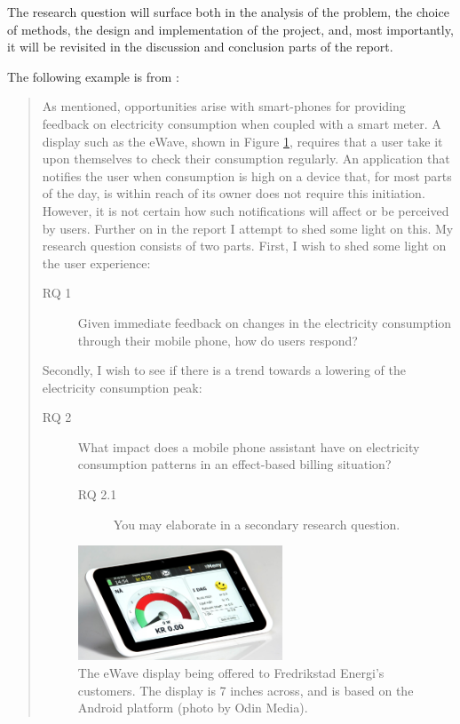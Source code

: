 The research question will surface both in the analysis of the problem, the choice of methods, the design and implementation of the project, and,  most importantly, it will be revisited in the discussion and conclusion parts of the report.

The following example is from  \cite{killerud14sgs}:

\begin{quotation}
As mentioned, opportunities arise with smart-phones for providing feedback on electricity consumption when coupled with a smart meter. A display such as the eWave, shown in Figure \ref{fig:display}, requires that a user take it upon themselves to check their consumption regularly. An application that notifies the user when consumption is high on a device that, for most parts of the day, is within reach of its owner does not require this initiation. However, it is not certain how such notifications will affect or be perceived by users. Further on in the report I attempt to shed some light on this.
My research question consists of two parts. First, I wish to shed some light on the user experience:


\begin{description}
\item [RQ 1] Given immediate feedback on changes in the electricity consumption through their mobile phone, how do users respond?
\end{description}

Secondly, I wish to see if there is a trend towards a lowering of the electricity consumption peak:

\begin{description}
\item [RQ 2]  What impact does a mobile phone assistant have on electricity consumption patterns in an effect-based billing situation?
\begin{description}
\item [RQ 2.1] You may elaborate in a secondary research question.
\end{description}
\end{description}

\begin{figure}[!htbp]
    \center
    \includegraphics[width=0.6\textwidth]{Graphics/display}
    \caption{The eWave display being offered to Fredrikstad Energi’s customers. The display is 7 inches across, and is based on the Android platform (photo by Odin Media).}
    \label{fig:display}
\end{figure}

\end{quotation}

